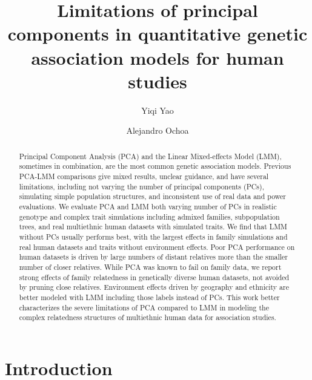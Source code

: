 \documentclass[9pt,lineno]{elife}
\title{Limitations of principal components in quantitative genetic association models for human studies}
\author[1\authfn{3}]{Yiqi Yao}
\author[1,2*]{Alejandro Ochoa}
\affil[1]{Department of Biostatistics and Bioinformatics, Duke University, Durham, NC 27705, USA}
\affil[2]{Duke Center for Statistical Genetics and Genomics, Duke University, Durham, NC 27705, USA}
\begin{document}
\maketitle

\begin{abstract}
  Principal Component Analysis (PCA) and the Linear Mixed-effects Model (LMM), sometimes in combination, are the most common genetic association models.
  Previous PCA-LMM comparisons give mixed results, unclear guidance, and have several limitations, including not varying the number of principal components (PCs), simulating simple population structures, and inconsistent use of real data and power evaluations.
  We evaluate PCA and LMM both varying number of PCs in realistic genotype and complex trait simulations including admixed families, subpopulation trees, and real multiethnic human datasets with simulated traits.
  We find that LMM without PCs usually performs best, with the largest effects in family simulations and real human datasets and traits without environment effects.
  Poor PCA performance on human datasets is driven by large numbers of distant relatives more than the smaller number of closer relatives.
  While PCA was known to fail on family data, we report strong effects of family relatedness in genetically diverse human datasets, not avoided by pruning close relatives.
  Environment effects driven by geography and ethnicity are better modeled with LMM including those labels instead of PCs.
  This work better characterizes the severe limitations of PCA compared to LMM in modeling the complex relatedness structures of multiethnic human data for association studies.
\end{abstract}


\section{Introduction}
\end{document}
